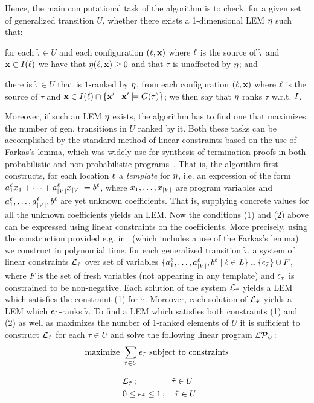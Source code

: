 Hence, the main computational task of the algorithm is to check, for a given set of generalized transition $U$, whether there exists a 1-dimensional LEM $\eta$ such that:
\begin{compactenum}
\item for each $\tilde{\tau}\in U$ and  each configuration $(\ell,\mathbf{x})$ where $\ell$ is the source of $\tilde{\tau}$ and $\mathbf{x}\in I(\ell)$ we have that $\eta(\ell,\mathbf{x})\geq 0$ and that $\tilde{\tau}$ is unaffected by $\eta$; and
\item there is $\tilde{\tau}\in U$ that is $1$-ranked by $\eta$, from each configuration $(\ell,\mathbf{x})$ where $\ell$ is the source of $\tilde{\tau}$ and $\mathbf{x}\in I(\ell)\cap\{\mathbf{x}'\mid \mathbf{x}'\models G(\tilde{\tau})\}$; we then say that $\eta$ ranks $\tilde{\tau}$ w.r.t. $I$.
\end{compactenum}
  Moreover, if such an LEM $\eta$ exists, the algorithm has to find one that maximizes the number of gen. transitions in $U$ ranked by it. Both these tasks can be accomplished by the standard  method of linear constraints based on the use of Farkas's lemma, which was widely use for synthesis of termination proofs in both probabilistic and non-probabilistic programs~\cite{xxx}. That is, the algorithm first constructs, for each location $\ell$ a \emph{template} for $\eta$, i.e. an expression of the form $a_1^{\ell}x_1 + \cdots + a_{|V|}^{\ell}x_{|V|} = b^{\ell} $, where $x_1,\dots,x_{|V|}$ are program variables and $a_1^{\ell},\dots,a_{|V|}^{\ell},b^{\ell} $ are yet unknown coefficients. That is, supplying concrete values for all the unknown coefficients yields an LEM. Now the conditions (1) and (2) above can be expressed using linear constraints on the coefficients. More precisely, using the construction provided e.g. in~\cite{xxx} (which includes a use of the Farkas's lemma) we construct in polynomial time, for each generalized transition $\tilde{\tau}$, a system of linear constraints $\mathcal{L}_{\tilde{\tau}}$ over set of variables $\{ a_1^{\ell},\dots,a_{|V|}^{\ell},b^{\ell}\mid \ell\in\mathit{L} \}\cup \{\epsilon_{\tilde\tau}\}\cup F$, where $F$ is the set of fresh variables (not appearing in any template) and $\epsilon_{\tilde\tau} $ is constrained to be non-negative. Each solution of the system $\mathcal{L}_{\tilde{\tau}}$ yields a LEM which satisfies the constraint (1) for $\tilde{\tau}$. Moreover, each solution of $\mathcal{L}_{\tilde{\tau}}$ yields a LEM which $\epsilon_{\tilde{\tau}}$-ranks $\tilde{\tau}$. To find a LEM which satisfies both constraints (1) and (2) as well as maximizes the number of 1-ranked elements of $U$ it is sufficient to construct $\mathcal{L}_{\tilde{\tau}}$ for each $\tilde{\tau}\in U$ and solve the following linear program $\mathcal{LP}_{U}$:
  \begin{align*}
\text{maximize }  &\sum_{\tilde{\tau} \in U} \epsilon_{\tilde\tau} \text{ subject to constraints}\\[0.3cm]
&\mathcal{L}_{\tilde{\tau}}\,;\quad\quad \quad\quad\tilde{\tau}\in U\\
&0 \leq \epsilon_{\tilde{\tau}} \leq 1\,; \quad \tilde{\tau}\in U
  \end{align*}
  
